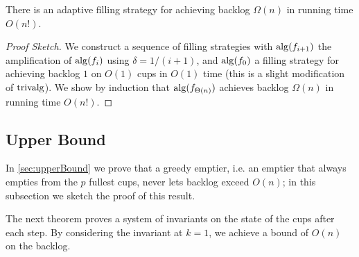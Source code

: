 \begin{theorem}
  There is an adaptive filling strategy for achieving backlog
  $\Omega(n)$ in running time $O(n!)$.
\end{theorem}
\begin{proof}[Proof Sketch]
We construct a sequence of filling strategies with $\operatorname{\text{\textup{alg}}}(f_{i+1})$ the
amplification of $\operatorname{\text{\textup{alg}}}(f_i)$ using $\delta = 1/(i+1)$, and
$\operatorname{\text{\textup{alg}}}(f_0)$ a filling strategy for achieving backlog $1$ on
$O(1)$ cups in $O(1)$ time (this is a slight modification of
$\operatorname{\text{\textup{trivalg}}}$). We show by induction that
$\operatorname{\text{\textup{alg}}}(f_{\Theta(n)})$ achieves backlog $\Omega(n)$ in running
time $O(n!)$.
\end{proof}

\subsection{Upper Bound}
In \cref{sec:upperBound} we prove that a greedy emptier, i.e. an
emptier that always empties from the $p$ fullest cups, never lets
backlog exceed $O(n)$; in this subsection we sketch the proof of
this result.

The next theorem proves a system of invariants on the state of the
cups after each step. By considering the invariant at $k = 1$, we achieve a bound of $O(n)$ on the backlog.

